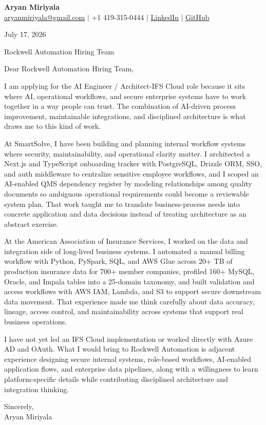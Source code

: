 \documentclass[letterpaper,11pt]{article}
\begin{document}
{\Large\textbf{Aryan Miriyala}}\\
\href{mailto:aryanmiriyala@gmail.com}{aryanmiriyala@gmail.com} $|$ +1 419-315-0444 $|$
\href{https://www.linkedin.com/in/aryan-miriyala-7788a21b6/}{LinkedIn} $|$
\href{https://github.com/aryanmiriyala}{GitHub}

July 17, 2026

Rockwell Automation Hiring Team

Dear Rockwell Automation Hiring Team,

I am applying for the AI Engineer / Architect-IFS Cloud role because it sits where AI, operational workflows, and secure enterprise systems have to work together in a way people can trust. The combination of AI-driven process improvement, maintainable integrations, and disciplined architecture is what draws me to this kind of work.

At SmartSolve, I have been building and planning internal workflow systems where security, maintainability, and operational clarity matter. I architected a Next.js and TypeScript onboarding tracker with PostgreSQL, Drizzle ORM, SSO, and auth middleware to centralize sensitive employee workflows, and I scoped an AI-enabled QMS dependency register by modeling relationships among quality documents so ambiguous operational requirements could become a reviewable system plan. That work taught me to translate business-process needs into concrete application and data decisions instead of treating architecture as an abstract exercise.

At the American Association of Insurance Services, I worked on the data and integration side of long-lived business systems. I automated a manual billing workflow with Python, PySpark, SQL, and AWS Glue across 20+ TB of production insurance data for 700+ member companies, profiled 160+ MySQL, Oracle, and Impala tables into a 25-domain taxonomy, and built validation and access workflows with AWS IAM, Lambda, and S3 to support secure downstream data movement. That experience made me think carefully about data accuracy, lineage, access control, and maintainability across systems that support real business operations.

I have not yet led an IFS Cloud implementation or worked directly with Azure AD and OAuth. What I would bring to Rockwell Automation is adjacent experience designing secure internal systems, role-based workflows, AI-enabled application flows, and enterprise data pipelines, along with a willingness to learn platform-specific details while contributing disciplined architecture and integration thinking.

Sincerely,\\
Aryan Miriyala
\end{document}
